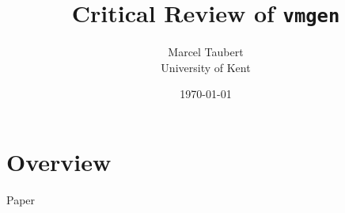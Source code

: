 \documentclass{article}
\title{Critical Review of \texttt{vmgen}}
\author{Marcel Taubert  \\
  University of Kent
}
\date{\today}
\begin{document}
\maketitle

\section{Overview}

Paper~\cite{vmgen}



\end{document}

